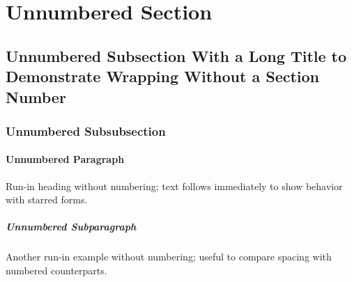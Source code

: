 \section*{Unnumbered Section}
\lipsum[12]

\subsection*{Unnumbered Subsection With a Long Title to Demonstrate Wrapping Without a Section Number}
\lipsum[13]

\subsubsection*{Unnumbered Subsubsection}
\lipsum[14]

\paragraph*{Unnumbered Paragraph} Run-in heading without numbering; text follows immediately to show behavior with starred forms.
\subparagraph*{Unnumbered Subparagraph} Another run-in example without numbering; useful to compare spacing with numbered counterparts.
